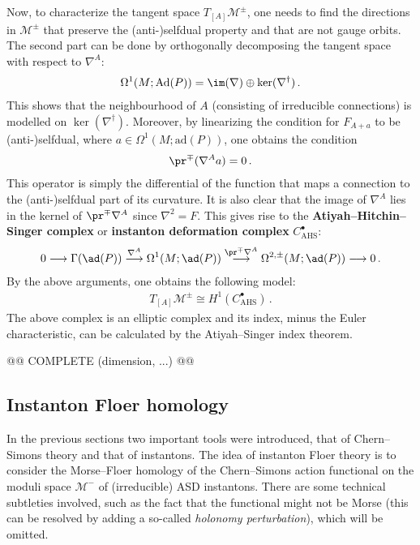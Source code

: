     Now, to characterize the tangent space $T_{[A]}\mathcal{M}^\pm$, one needs to find the directions in $\mathcal{M}^\pm$ that preserve the (anti-)selfdual property and that are not gauge orbits. The second part can be done by orthogonally decomposing the tangent space with respect to $\nabla^A$:
    \begin{gather}
        \Omega^1(M;\mathrm{Ad}(P))=\im(\nabla)\oplus\ker(\nabla^\dagger)\,.
    \end{gather}
    This shows that the neighbourhood of $A$ (consisting of irreducible connections) is modelled on $\ker(\nabla^\dagger)$. Moreover, by linearizing the condition for $F_{A+a}$ to be (anti-)selfdual, where $a\in\Omega^1(M;\mathrm{ad}(P))$, one obtains the condition
    \begin{gather}
        \pr^\mp(\nabla^Aa)=0\,.
    \end{gather}
    This operator is simply the differential of the function that maps a connection to the (anti-)selfdual part of its curvature. It is also clear that the image of $\nabla^A$ lies in the kernel of $\pr^\mp\nabla^A$ since $\nabla^2=F$. This gives rise to the \textbf{Atiyah--Hitchin--Singer complex} or \textbf{instanton deformation complex} $C^\bullet_{\text{AHS}}$:
    \begin{gather}
        0\longrightarrow\Gamma(\ad(P))\overset{\nabla^A}{\longrightarrow}\Omega^1(M;\ad(P))\overset{\pr^\mp\nabla^A}{\longrightarrow}\Omega^{2,\pm}(M;\ad(P))\longrightarrow0\,.
    \end{gather}
    By the above arguments, one obtains the following model:
    \begin{gather}
        T_{[A]}\mathcal{M}^\pm\cong H^1(C^\bullet_{\text{AHS}})\,.
    \end{gather}
    The above complex is an elliptic complex and its index, minus the Euler characteristic, can be calculated by the Atiyah--Singer index theorem.

    @@ COMPLETE (dimension, ...) @@

\subsection{Instanton Floer homology}

    In the previous sections two important tools were introduced, that of Chern--Simons theory and that of instantons. The idea of instanton Floer theory is to consider the Morse--Floer homology of the Chern--Simons action functional on the moduli space $\mathcal{M}^-$ of (irreducible) ASD instantons. There are some technical subtleties involved, such as the fact that the functional might not be Morse (this can be resolved by adding a so-called \textit{holonomy perturbation}), which will be omitted.

